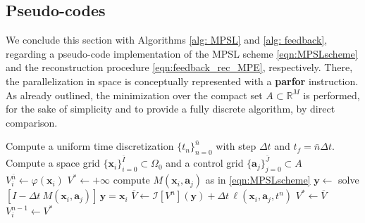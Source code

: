 \documentclass[10pt]{article}
\theoremstyle{remark}
\theoremstyle{definition}
\theoremstyle{remark}
\begin{document}
\subsection{Pseudo-codes}
We conclude this section with Algorithms \ref{alg: MPSL} and \ref{alg: feedback}, regarding a pseudo-code implementation of the MPSL scheme \eqref{eqn:MPSLscheme} and the reconstruction procedure \eqref{eqn:feedback_rec_MPE}, respectively. There, the parallelization in space is conceptually represented with a \textbf{parfor} instruction. As already outlined, the minimization over the compact set $A\subset \mathbb{R}^M$ is performed, for the sake of simplicity and to provide a fully discrete algorithm, by direct comparison.
\begin{algorithm}
\caption{Fully discrete MPSL algorithm} \label{alg: MPSL}
    \begin{algorithmic}[1]
        \State Compute a uniform time discretization $\{t_n\}_{n=0}^{\bar{n}}$ with step $\Delta t$ and $t_f=\bar{n} \Delta t.$
        \State Compute a space grid $\{\bm{x}_i\}_{i=0}^{\bar{I}} \subset \Omega_0$ and a control grid $\{\bm{a}_j\}_{j=0}^{\bar{J}} \subset A$
            \State $V^{\bar{n}}_i \gets \varphi(\bm{x}_i)$ %
        \EndFor
                \State $V^* \gets +\infty$
                    \State compute $M(\bm{x}_i,\bm{a}_j)$ as in \eqref{eqn:MPSLscheme}
                    \State $\bm{y} \gets$ solve $[I-\Delta t \ M(\bm{x}_i,\bm{a}_j)]\, \bm{y} = \bm{x}_i$ %
                    \State $\overline{V} \gets \mathcal{I} \left[ V^n\right](\bm{y}) + \Delta t \,\ell(\bm{x}_i,\bm{a}_j,t^n)$ %
                        \State $V^* \gets \overline{V}$
                    \EndIf
                \EndFor
                \State $V^{n-1}_i \gets V^*$
            \EndParFor
        \EndFor
    \end{algorithmic}
\end{algorithm}
\end{document}
